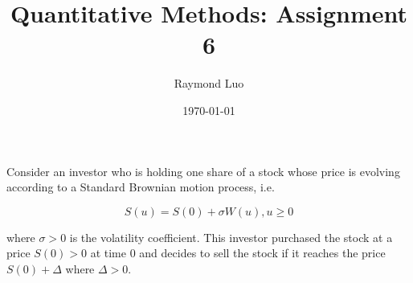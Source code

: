 \documentclass[12pt,twoside, letter]{exam}
\theoremstyle{definition}
\begin{document}
\abovedisplayskip=12pt
\belowdisplayskip=12pt
\abovedisplayshortskip=7pt
\belowdisplayshortskip=10pt
\allowdisplaybreaks

\setlength{\parindent}{18pt}

\title{Quantitative Methods: Assignment 6}
\author{Raymond Luo}
\date{\today}
\maketitle

\par{Consider an investor who is holding one share of a stock whose price is evolving according to a Standard Brownian motion process, i.e.}

\begin{equation*}
  S(u) = S(0) + \sigma W(u), u \geq 0
\end{equation*}

where $\sigma > 0$ is the volatility coefficient. This investor purchased the stock at a price $S(0) > 0$ at time 0 and decides to sell the stock if
it reaches the price $S(0) + \Delta$ where $\Delta > 0$.
\end{document}
